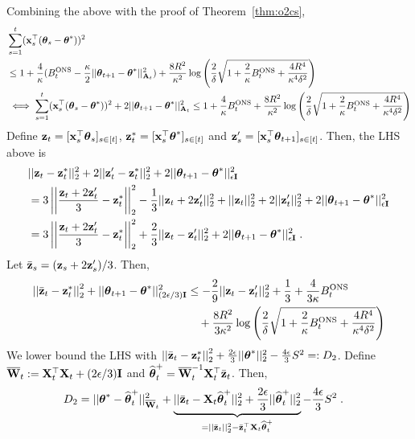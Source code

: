 Combining the above with the proof of Theorem~\ref{thm:o2cs},
\begin{equation*}\begin{aligned}
&    \sum_{s=1}^t(\x_s^\T(\th_s-\th^*))^2 
\\&\le 1 + \fr{4}{\kappa}(B^{\ONS}_t - \fr{\kap}{2} ||\th_{t+1} - \th^*||^2_{\A_t} ) + \fr{8R^2}{\kappa^2} \log\lt(\fr{2}{\dt}\sqrt{ 1+ \fr{2}{\kappa}B^{\ONS}_t + \fr{4R^4}{\kappa^4\dt^2} } \rt)
\\&\iff\sum_{s=1}^t(\x_s^\T(\th_s-\th^*))^2 + 2||\th_{t+1} - \th^*||^2_{\A_t} 
      \le 1 + \fr{4}{\kappa}B^{\ONS}_t + \fr{8R^2}{\kappa^2} \log\lt(\fr{2}{\dt}\sqrt{ 1+ \fr{2}{\kappa}B^{\ONS}_t + \fr{4R^4}{\kappa^4\dt^2} } \rt)
\end{aligned}\end{equation*} %
Define $\z_t = [ \x_s^\T\th_s ]_{s\in[t]}$, $\z^*_t = [\x_s^\T\th^* ]_{s\in[t]}$ and $\z'_s = [\x_s^\T\th_{t+1}]_{s\in[t]}$.
Then, the LHS above is
\begin{equation*}\begin{aligned}
  &||\z_t - \z^*_t||_2^2 + 2||\z'_t - \z^*_t||_2^2 + 2||\th_{t+1}-\th^*||^2_{\eps\I}
\\& = 3 \lnorm \fr{\z_t + 2\z'_t}{3} - \z^*_t \rnorm^2_2 - \fr{1}{3} ||\z_t + 2\z'_t||^2_2 + ||\z_t||^2_2 + 2||\z'_t||^2_2 + 2||\th_{t+1}-\th^*||^2_{\eps\I}
\\& = 3 \lnorm \fr{\z_t + 2\z'_t}{3} - \z^*_t \rnorm^2_2 + \fr{2}{3}||\z_t-\z'_t||^2_2 + 2||\th_{t+1}-\th^*||^2_{\eps\I}\;.
\end{aligned}\end{equation*}
Let $\bar\z_s = (\z_s+2\z'_s)/3$. Then,
\begin{equation*}\begin{aligned}
  \lnorm \bar\z_t - \z^*_t\rnorm^2_2 + ||\th_{t+1}-\th^*||^2_{(2\eps/3)\I} 
  &\le -\fr{2}{9}||\z_t - \z'_t||^2_2 + \fr{1}{3} + \fr{4}{3\kap}B^{\ONS}_t 
  \\&\quad + \fr{8R^2}{3\kap^2}\log\lt(\fr{2}{\dt}\sqrt{ 1+ \fr{2}{\kappa}B^{\ONS}_t + \fr{4R^4}{\kappa^4\dt^2} } \rt)
\end{aligned}\end{equation*}
We lower bound the LHS with $\lnorm \bar\z_t - \z^*_t\rnorm^2_2 + \fr{2\eps}{3}||\th^*||^2_2 - \fr{4\eps}{3} S^2 =: D_2 $.
Define $\barW_t := \X_t^\T\X_t + (2\eps/3)\I$ and $\hth^+_t = \ibarW_t\X_t^\T\bar\z_t$.
Then,
\begin{equation*}\begin{aligned}
D_2 
  &= ||\th^* - \hth^+_t||^2_{\barW_t} + \underbrace{||\bar\z_t - \X_t \hth^+_t||^2_2 + \fr{2\eps}{3}||\hth^+_t||^2_2}_{ = ||\bar\z_t||^2_2 - \bar\z_t^\T\X_t\hth^+_t } -\fr{4\eps}{3} S^2 \;.
\end{aligned}\end{equation*}
